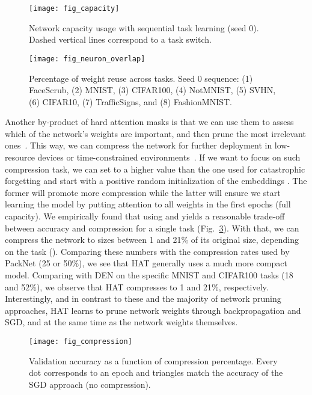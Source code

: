 \begin{figure}[t]
\begin{center}
	\texttt{[image: fig\_capacity]}
\vskip -0.15in
	\caption{Network capacity usage with sequential task learning (seed 0). Dashed vertical lines correspond to a task switch.}
	\label{fig:capacity}
	\end{center}
	\vskip -0.1in
\end{figure} 

\begin{figure}[t]
	\vskip 0.2in
	\begin{center}
	\texttt{[image: fig\_neuron\_overlap]}
\vskip -0.1in
\caption{Percentage of weight reuse across tasks. Seed 0 sequence: (1) FaceScrub, (2) MNIST, (3) CIFAR100, (4) NotMNIST, (5) SVHN, (6) CIFAR10, (7) TrafficSigns, and (8) FashionMNIST.}
	\label{fig:neuron_overlap}
	\end{center}
	\vskip -0.1in
\end{figure} 

Another by-product of hard attention masks is that we can use them to assess which of the network's weights are important, and then prune the most irrelevant ones~\cite{LeCun90NIPS}. This way, we can compress the network for further deployment in low-resource devices or time-constrained environments~\citep[cf.][]{Han16ICLR}. If we want to focus on such compression task, we can set  to a higher value than the one used for catastrophic forgetting and start with a positive random initialization of the embeddings . The former will promote more compression while the latter will ensure we start learning the model by putting attention to all weights in the first epochs (full capacity). We empirically found that using  and  yields a reasonable trade-off between accuracy and compression for a single task (Fig.~\ref{fig:compression}). With that, we can compress the network to sizes between 1 and 21\% of its original size, depending on the task (). Comparing these numbers with the compression rates used by PackNet (25 or 50\%), we see that HAT generally uses a much more compact model. Comparing with DEN on the specific MNIST and CIFAR100 tasks (18 and 52\%), we observe that HAT compresses to 1 and 21\%, respectively. Interestingly, and in contrast to these and the majority of network pruning approaches, HAT learns to prune network weights through backpropagation and SGD, and at the same time as the network weights themselves.

\begin{figure}[t]
\begin{center}
	\texttt{[image: fig\_compression]}
\vskip -0.15in
	\caption{Validation accuracy  as a function of compression percentage. Every dot corresponds to an epoch and triangles match the accuracy of the SGD approach (no compression).}
	\label{fig:compression}
	\end{center}
	\vskip -0.1in
\end{figure} 



